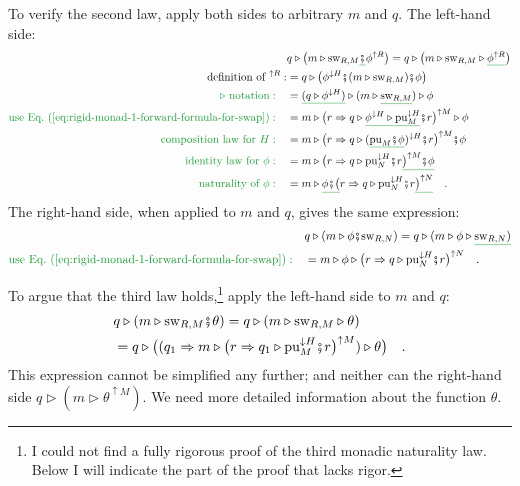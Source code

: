 To verify the second law, apply both sides to arbitrary $m$ and $q$.
The left-hand side:
\begin{align*}
 & q\triangleright\big(m\triangleright\text{sw}_{R,M}\gunderline{\bef}\phi^{\uparrow R}\big)=q\triangleright\big(m\triangleright\text{sw}_{R,M}\triangleright\gunderline{\phi^{\uparrow R}}\big)\\
\text{definition of }^{\uparrow R}: & =q\triangleright\big(\phi^{\downarrow H}\bef(m\triangleright\text{sw}_{R,M})\bef\phi\big)\\
{\color{greenunder}\triangleright\text{ notation}:}\quad & =\gunderline{(q\triangleright\phi^{\downarrow H})}\triangleright(m\triangleright\gunderline{\text{sw}_{R,M}})\triangleright\phi\\
{\color{greenunder}\text{use Eq.~(\ref{eq:rigid-monad-1-forward-formula-for-swap})}:}\quad & =m\triangleright\big(r\Rightarrow q\triangleright\gunderline{\phi^{\downarrow H}\triangleright\text{pu}_{M}^{\downarrow H}}\bef r\big)^{\uparrow M}\triangleright\phi\\
{\color{greenunder}\text{composition law for }H:}\quad & =m\triangleright\big(r\Rightarrow q\triangleright(\gunderline{\text{pu}_{M}\bef\phi})^{\downarrow H}\bef r\big)^{\uparrow M}\bef\phi\\
{\color{greenunder}\text{identity law for }\phi:}\quad & =m\triangleright\big(r\Rightarrow q\triangleright\text{pu}_{N}^{\downarrow H}\bef r\gunderline{\big)^{\uparrow M}\bef\phi}\\
{\color{greenunder}\text{naturality of }\phi:}\quad & =m\triangleright\gunderline{\phi\bef\big(}r\Rightarrow q\triangleright\text{pu}_{N}^{\downarrow H}\bef r\gunderline{\big)^{\uparrow N}}\quad.
\end{align*}
The right-hand side, when applied to $m$ and $q$, gives the same
expression:
\begin{align*}
 & q\triangleright(m\triangleright\phi\bef\text{sw}_{R,N})=q\triangleright(m\triangleright\phi\triangleright\gunderline{\text{sw}_{R,N})}\\
{\color{greenunder}\text{use Eq.~(\ref{eq:rigid-monad-1-forward-formula-for-swap})}:}\quad & =m\triangleright\phi\triangleright\big(r\Rightarrow q\triangleright\text{pu}_{N}^{\downarrow H}\bef r\big)^{\uparrow N}\quad.
\end{align*}

To argue that the third law holds,\footnote{I could not find a fully rigorous proof of the third monadic naturality
law. Below I will indicate the part of the proof that lacks rigor.} apply the left-hand side to $m$ and $q$:
\begin{align}
 & q\triangleright(m\triangleright\text{sw}_{R,M}\bef\theta)=q\triangleright(m\triangleright\text{sw}_{R,M}\triangleright\theta)\nonumber \\
 & =q\triangleright\big((q_{1}\Rightarrow m\triangleright\big(r\Rightarrow q_{1}\triangleright\text{pu}_{M}^{\downarrow H}\bef r\big)^{\uparrow M})\triangleright\theta\big)\quad.\label{eq:rigid-monad-1-derivation7}
\end{align}
This expression cannot be simplified any further; and neither can
the right-hand side $q\triangleright(m\triangleright\theta^{\uparrow M})$.
We need more detailed information about the function $\theta$. 

